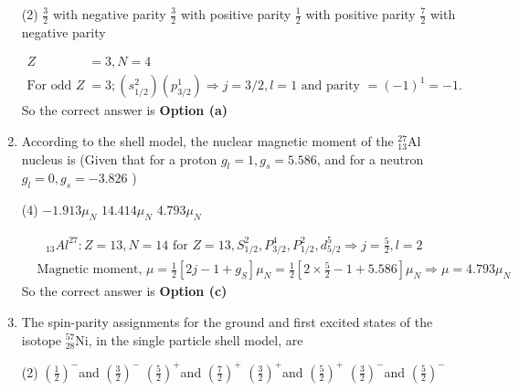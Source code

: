 \begin{enumerate}
	{}
	\begin{tasks}(2)
		\task[\textbf{a.}]$\frac{3}{2}$ with negative parity
		\task[\textbf{b.}]$\frac{3}{2}$ with positive parity
		\task[\textbf{c.}]$\frac{1}{2}$ with positive parity
		\task[\textbf{d.}] $\frac{7}{2}$ with negative parity
	\end{tasks}
	\begin{answer}
		\begin{align*}
		Z&=3, N=4\\
		\text{For odd }Z&=3 ;\left(s_{1 / 2}^2\right)\left(p_{3 / 2}^1\right) \Rightarrow j=3 / 2, l=1\text{ and parity $=(-1)^1=-1$.}
		\end{align*}
		So the correct answer is \textbf{Option (a)}
	\end{answer}
	\item  According to the shell model, the nuclear magnetic moment of the ${ }_{13}^{27} \mathrm{Al}$ nucleus is (Given that for a proton $g_l=1, g_s=5.586$, and for a neutron $g_l=0, g_s=-3.826$ )
	{}
	\begin{tasks}(4)
		\task[\textbf{a.}] $-1.913 \mu_N$
		\task[\textbf{b.}] $14.414 \mu_N$
		\task[\textbf{c.}]$4.793 \mu_N$
	\end{tasks}
	\begin{answer}
		\begin{align*}
		&\text{ ${ }_{13} A l^{27}: Z=13, N=14$ for $Z=13, S_{1 / 2}^2, P_{3 / 2}^4, P_{1 / 2}^2, d_{5 / 2}^5 \Rightarrow j=\frac{5}{2}, l=2$}\\
		&\text{Magnetic moment, $\mu=\frac{1}{2}\left[2 j-1+g_S\right] \mu_N=\frac{1}{2}\left[2 \times \frac{5}{2}-1+5.586\right] \mu_N \Rightarrow \mu=4.793 \mu_N$}
		\end{align*}
		So the correct answer is \textbf{Option (c)}
	\end{answer}
	\item  The spin-parity assignments for the ground and first excited states of the isotope ${ }_{28}^{57} \mathrm{Ni}$, in the single particle shell model, are
	{}
	\begin{tasks}(2)
		\task[\textbf{a.}]$\left(\frac{1}{2}\right)^{-}$and $\left(\frac{3}{2}\right)^{-}$
		\task[\textbf{b.}] $\left(\frac{5}{2}\right)^{+}$and $\left(\frac{7}{2}\right)^{+}$
		\task[\textbf{c.}]$\left(\frac{3}{2}\right)^{+}$and $\left(\frac{5}{2}\right)^{+}$
		\task[\textbf{d.}] $\left(\frac{3}{2}\right)^{-}$and $\left(\frac{5}{2}\right)^{-}$
	\end{tasks}

\end{enumerate}
